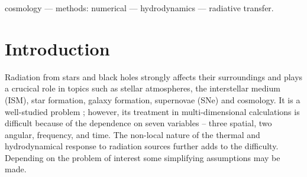 \documentclass[useAMS,usenatbib,a4paper]{mn2e}
\begin{document}
\begin{keywords}
  cosmology --- methods: numerical --- hydrodynamics --- radiative
  transfer.
\end{keywords}

\section{Introduction}

Radiation from stars and black holes strongly affects their
surroundings and plays a crucical role in topics such as stellar
atmospheres, the interstellar medium (ISM), star formation, galaxy
formation, supernovae (SNe) and cosmology.  It is a well-studied
problem \citep[e.g.][]{Mathews65, Rybicki, Mihalas84, Yorke86};
however, its treatment in multi-dimensional calculations is difficult
because of the dependence on seven variables -- three spatial, two
angular, frequency, and time.  The non-local nature of the thermal and
hydrodynamical response to radiation sources further adds to the
difficulty.  Depending on the problem of interest some simplifying
assumptions may be made.
\end{document}
